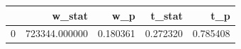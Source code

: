 \begin{tabular}{lrrrr}
\toprule
 & w_stat & w_p & t_stat & t_p \\
\midrule
0 & 723344.000000 & 0.180361 & 0.272320 & 0.785408 \\
\bottomrule
\end{tabular}
